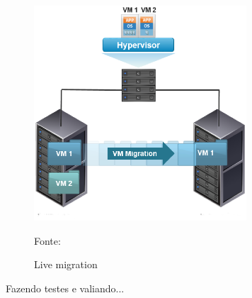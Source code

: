 
\begin{figure}[h!]
 \centering
 \includegraphics[width=300px]{img/vms_migration.eps}
 \caption{Live migration}
 Fonte: \citet{spaniol2015}
 \label{fig:vms_migration}
\end{figure}


Fazendo testes e valiando...


